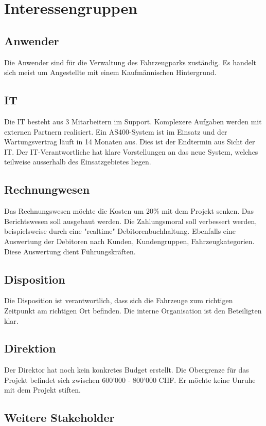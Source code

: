 \section{Interessengruppen}
\subsection{Anwender}
Die Anwender sind für die Verwaltung des Fahrzeugparks zuständig. Es handelt sich meist um Angestellte mit einem Kaufmännischen Hintergrund. 


\subsection{IT}
Die IT besteht aus 3 Mitarbeitern im Support. Komplexere Aufgaben werden mit externen Partnern realisiert. Ein AS400-System ist im Einsatz und der Wartungsvertrag läuft in 14 Monaten aus. Dies ist der Endtermin aus Sicht der IT. Der IT-Verantwortliche hat klare Vorstellungen an das neue System, welches teilweise ausserhalb des Einsatzgebietes liegen. 

\subsection{Rechnungwesen}
Das Rechnungswesen möchte die Kosten um 20\% mit dem Projekt senken. Das Berichtswesen soll ausgebaut werden. Die Zahlungsmoral soll verbessert werden, beispielsweise durch eine "realtime" Debitorenbuchhaltung. Ebenfalls eine Auswertung der Debitoren nach Kunden, Kundengruppen, Fahrzeugkategorien. Diese Auswertung dient Führungskräften. 

\subsection{Disposition}
Die Disposition ist verantwortlich, dass sich die Fahrzeuge zum richtigen Zeitpunkt am richtigen Ort befinden. Die interne Organisation ist den Beteiligten klar. 

\subsection{Direktion}
Der Direktor hat noch kein konkretes Budget erstellt. Die Obergrenze für das Projekt befindet sich zwischen 600'000 - 800'000 CHF. Er möchte keine Unruhe mit dem Projekt stiften. 

\subsection{Weitere Stakeholder}